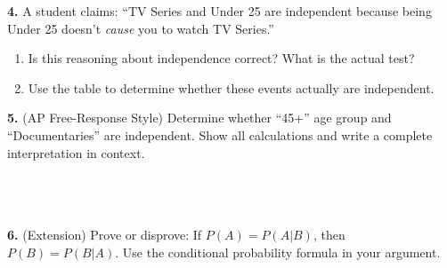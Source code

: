\documentclass[10pt]{article}
\begin{document}
\begin{practicebox}
\vspace{8pt}
\textbf{4.} A student claims: ``TV Series and Under 25 are independent because
being Under 25 doesn't \emph{cause} you to watch TV Series.''
\begin{enumerate}[label=(\alph*), leftmargin=2em, itemsep=6pt]
  \item Is this reasoning about independence correct? What is the actual test?\\
        \writeline\writeline
  \item Use the table to determine whether these events actually are independent.\\
        \writeline\writeline
\end{enumerate}

\vspace{8pt}
\textbf{5.} (AP Free-Response Style) Determine whether ``45+'' age group and
``Documentaries'' are independent. Show all calculations and write a complete
interpretation in context.\\
\writeline\\[1pt]\writeline\\[1pt]\writeline\\[1pt]\writeline

\vspace{8pt}
\textbf{6.} (Extension) Prove or disprove: If $P(A) = P(A|B)$, then
$P(B) = P(B|A)$. Use the conditional probability formula in your argument.\\
\writeline\\[1pt]\writeline\\[1pt]\writeline
\end{practicebox}
\end{document}
